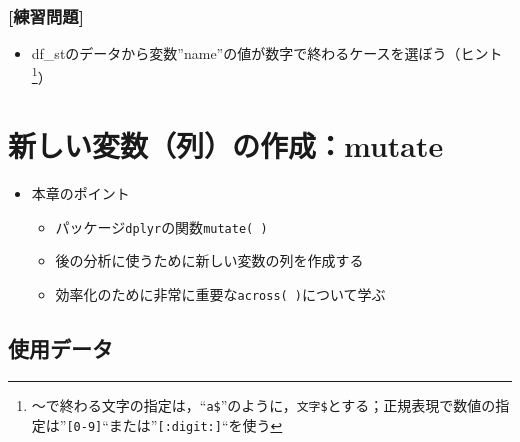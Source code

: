\documentclass[
  xelatex,ja=standard, b5paper]{bxjsbook}
\providecommand{\tightlist}{%
  \setlength{\itemsep}{0pt}\setlength{\parskip}{0pt}}
\begin{document}
\hypertarget{ux7df4ux7fd2ux554fux984c-8}{%
\subsection{{[}練習問題{]}}\label{ux7df4ux7fd2ux554fux984c-8}}

\begin{itemize}
\tightlist
\item
  df\_stのデータから変数''name''の値が数字で終わるケースを選ぼう（ヒント\footnote{～で終わる文字の指定は，``\texttt{a\$}''のように，\texttt{文字\$}とする；正規表現で数値の指定は''\texttt{{[}0-9{]}}``または''\texttt{{[}:digit:{]}}``を使う}）
  　
\end{itemize}

\hypertarget{mutate}{%
\chapter{新しい変数（列）の作成：mutate}\label{mutate}}

\begin{itemize}
\tightlist
\item
  本章のポイント

  \begin{itemize}
  \tightlist
  \item
    パッケージ\texttt{dplyr}の関数\texttt{mutate(\ )}
  \item
    後の分析に使うために新しい変数の列を作成する
  \item
    効率化のために非常に重要な\texttt{across(\ )}について学ぶ
  \end{itemize}
\end{itemize}

\hypertarget{mu-read}{%
\section{使用データ}\label{mu-read}}
\end{document}
